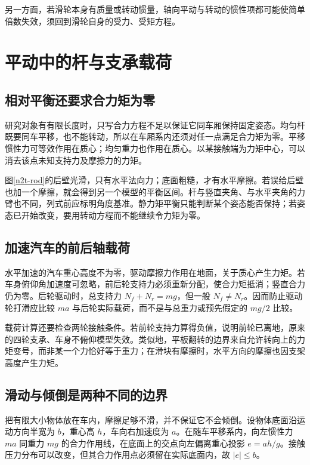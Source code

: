 另一方面，若滑轮本身有质量或转动惯量，轴向平动与转动的惯性项都可能使简单倍数失效，须回到滑轮自身的受力、受矩方程。

\section{平动中的杆与支承载荷}
\subsection{相对平衡还要求合力矩为零}
研究对象有有限长度时，只写合力方程不足以保证它同车厢保持固定姿态。均匀杆既要同车平移，也不能转动，所以在车厢系内还须对任一点满足合力矩为零。平移惯性力可等效作用在质心；均匀重力也作用在质心。以某接触端为力矩中心，可以消去该点未知支持力及摩擦力的力矩。

图\ref{n2t-rod}的后壁光滑，只有水平法向力；底面粗糙，才有水平摩擦。若误给后壁也加一个摩擦，就会得到另一个模型的平衡区间。杆与竖直夹角、与水平夹角的力臂也不同，列式前应标明角度基准。静力矩平衡只能判断某个姿态能否保持；若姿态已开始改变，要用转动方程而不能继续令力矩为零。

\subsection{加速汽车的前后轴载荷}
水平加速的汽车重心高度不为零，驱动摩擦力作用在地面，关于质心产生力矩。若车身俯仰角加速度可忽略，前后轮支持力必须重新分配，使合力矩抵消；竖直合力仍为零。后轮驱动时，总支持力 $N_f+N_r=mg$，但一般 $N_f\ne N_r$。因而防止驱动轮打滑应比较 $ma$ 与后轮实际载荷，而不是与总重力或预先假定的 $mg/2$ 比较。

载荷计算还要检查两轮接触条件。若前轮支持力算得负值，说明前轮已离地，原来的四轮支承、车身不俯仰模型失效。类似地，平板翻转的边界来自允许转向上的力矩变号，而非某一个力恰好等于重力；在滑块有摩擦时，水平方向的摩擦也因支架高度产生力矩。



\subsection{滑动与倾倒是两种不同的边界}
把有限大小物体放在车内，摩擦足够不滑，并不保证它不会倾倒。设物体底面沿运动方向半宽为 $b$，重心高 $h$，车向右加速度为 $a$。在随车平移系内，向左惯性力 $ma$ 同重力 $mg$ 的合力作用线，在底面上的交点向左偏离重心投影 $e=ah/g$。接触压力分布可以改变，但其合力作用点必须留在实际底面内，故 $|e|\le b$。

